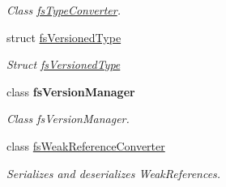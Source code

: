 \begin{DoxyCompactItemize}
\begin{DoxyCompactList}\small\item\em Class \hyperlink{class_full_serializer_1_1_internal_1_1fs_type_converter}{fs\+Type\+Converter}. \end{DoxyCompactList}\item 
struct \hyperlink{struct_full_serializer_1_1_internal_1_1fs_versioned_type}{fs\+Versioned\+Type}
\begin{DoxyCompactList}\small\item\em Struct \hyperlink{struct_full_serializer_1_1_internal_1_1fs_versioned_type}{fs\+Versioned\+Type} \end{DoxyCompactList}\item 
class {\bfseries fs\+Version\+Manager}
\begin{DoxyCompactList}\small\item\em Class fs\+Version\+Manager. \end{DoxyCompactList}\item 
class \hyperlink{class_full_serializer_1_1_internal_1_1fs_weak_reference_converter}{fs\+Weak\+Reference\+Converter}
\begin{DoxyCompactList}\small\item\em Serializes and deserializes Weak\+References. \end{DoxyCompactList}\end{DoxyCompactItemize}
